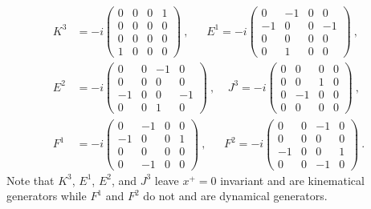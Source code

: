 \documentclass[12pt,a4paper]{report}
\begin{document}
\begin{align}
K^3 &=  -i \begin{pmatrix}0 & 0 & 0 & 1 \\
                 0 & 0 & 0 & 0 \\
                 0 & 0 & 0 & 0 \\
                 1 & 0 & 0 & 0 \end{pmatrix} ~,~~~~~~~
E^{1} = -i \begin{pmatrix}0 & -1 & 0 & 0 \\
                       -1 & 0 & 0 & -1 \\
                       0 & 0 & 0 & 0 \\
                       0 & 1 & 0 & 0 \end{pmatrix}~,\\
E^{2} &= -i \begin{pmatrix}0 & 0 & -1 & 0 \\
                       0 & 0 & 0 & 0 \\
                       -1 & 0 & 0 & -1 \\
                       0 & 0 & 1 & 0 \end{pmatrix}~, ~~~~~
J^{3} = -i \begin{pmatrix}0 & 0 & 0 & 0 \\
                        0 & 0 & 1 & 0 \\
                        0 & -1 & 0 & 0 \\
                        0 & 0 & 0 & 0 \end{pmatrix}~,\\
F^{1} &= -i \begin{pmatrix}0 & -1 & 0 & 0 \\
                       -1 & 0 & 0 & 1 \\
                       0 & 0 & 0 & 0 \\
                       0 & -1 & 0 & 0 \end{pmatrix}~, ~~~~~~~
F^{2} = -i \begin{pmatrix}0 & 0 & -1 & 0 \\
                       0 & 0 & 0 & 0 \\
                       -1 & 0 & 0 & 1 \\
                       0 & 0 & -1 & 0 \end{pmatrix}  ~.
\end{align} 
Note that $K^3$, $E^1$, $E^2$, and $J^3$ leave $x^+=0$
invariant and are kinematical generators while $F^1$ and $F^2$ do not and
are dynamical generators.
\end{document}
